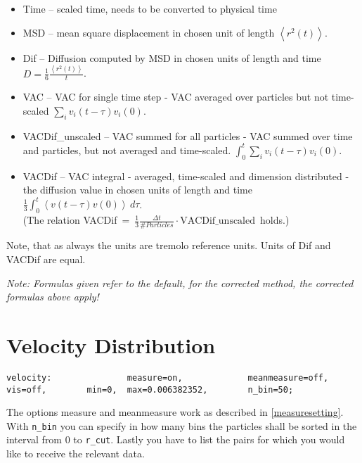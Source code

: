 \begin{itemize}
\item Time -- scaled time, needs to be converted to physical time

\item MSD -- mean square displacement in chosen unit of length $\left<r^2(t)\right>$.

\item Dif -- Diffusion computed by MSD in chosen units of length and time  $D = \frac{1}{6} \frac{\left<r^2(t)\right>}{t}$.

\item VAC -- VAC for single time step - VAC averaged over particles but not time-scaled $\sum_iv_i(t-\tau) v_i(0) $.

\item VACDif\_unscaled -- VAC summed for all particles - VAC summed over time and particles, but not averaged and time-scaled. $\int_0^t \sum_i v_i(t-\tau) v_i(0) $.

\item VACDif -- VAC integral - averaged, time-scaled and dimension distributed - the diffusion value in chosen units of length and time $\frac{1}{3} \int_0^t \left< v(t-\tau) v(0) \right> \, d\tau$.\\
(The relation \mbox{VACDif = $\frac{1}{3} \frac{\Delta t}{\# Particles} \cdot \text{VACDif\_unscaled}$ }holds.)
\end{itemize}
Note, that as always the units are tremolo reference units. Units of Dif and VACDif are equal.

\emph{Note: Formulas given refer to the default, for the corrected method, the corrected formulas above apply!}



\section{Velocity Distribution}

\begin{lstlisting}
velocity:               measure=on,             meanmeasure=off,                vis=off,        min=0,  max=0.006382352,        n_bin=50;
\end{lstlisting}

The options measure and meanmeasure work as described in \ref{measuresetting}.
With {\tt n\_bin} you can specify in how many bins the particles shall be sorted in the interval from 0 to {\tt r\_cut}. Lastly you have to list the pairs for which you would like to receive the relevant data. 

